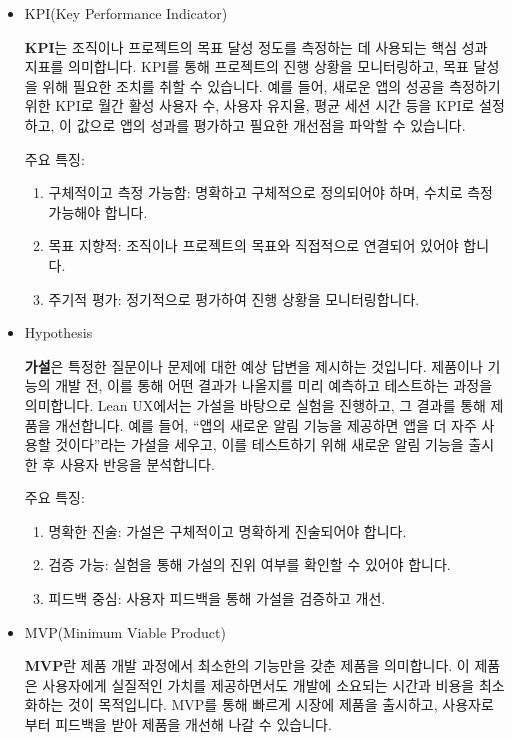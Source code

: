 \documentclass[
  letterpaper,
]{book}
\providecommand{\tightlist}{%
  \setlength{\itemsep}{0pt}\setlength{\parskip}{0pt}}\usepackage{longtable,booktabs,array}
\begin{document}
\begin{itemize}
\item
  KPI(Key Performance Indicator)

  \textbf{KPI}는 조직이나 프로젝트의 목표 달성 정도를 측정하는 데
  사용되는 핵심 성과 지표를 의미합니다. KPI를 통해 프로젝트의 진행
  상황을 모니터링하고, 목표 달성을 위해 필요한 조치를 취할 수 있습니다.
  예를 들어, 새로운 앱의 성공을 측정하기 위한 KPI로 월간 활성 사용자 수,
  사용자 유지율, 평균 세션 시간 등을 KPI로 설정하고, 이 값으로 앱의
  성과를 평가하고 필요한 개선점을 파악할 수 있습니다.

  주요 특징:

  \begin{enumerate}
  \def\labelenumi{\arabic{enumi}.}
  \tightlist
  \item
    구체적이고 측정 가능함: 명확하고 구체적으로 정의되어야 하며, 수치로
    측정 가능해야 합니다.
  \item
    목표 지향적: 조직이나 프로젝트의 목표와 직접적으로 연결되어 있어야
    합니다.
  \item
    주기적 평가: 정기적으로 평가하여 진행 상황을 모니터링합니다.
  \end{enumerate}
\item
  Hypothesis

  \textbf{가설}은 특정한 질문이나 문제에 대한 예상 답변을 제시하는
  것입니다. 제품이나 기능의 개발 전, 이를 통해 어떤 결과가 나올지를 미리
  예측하고 테스트하는 과정을 의미합니다. Lean UX에서는 가설을 바탕으로
  실험을 진행하고, 그 결과를 통해 제품을 개선합니다. 예를 들어, ``앱의
  새로운 알림 기능을 제공하면 앱을 더 자주 사용할 것이다''라는 가설을
  세우고, 이를 테스트하기 위해 새로운 알림 기능을 출시한 후 사용자
  반응을 분석합니다.

  주요 특징:

  \begin{enumerate}
  \def\labelenumi{\arabic{enumi}.}
  \tightlist
  \item
    명확한 진술: 가설은 구체적이고 명확하게 진술되어야 합니다.
  \item
    검증 가능: 실험을 통해 가설의 진위 여부를 확인할 수 있어야 합니다.
  \item
    피드백 중심: 사용자 피드백을 통해 가설을 검증하고 개선.
  \end{enumerate}
\item
  MVP(Minimum Viable Product)

  \textbf{MVP}란 제품 개발 과정에서 최소한의 기능만을 갖춘 제품을
  의미합니다. 이 제품은 사용자에게 실질적인 가치를 제공하면서도 개발에
  소요되는 시간과 비용을 최소화하는 것이 목적입니다. MVP를 통해 빠르게
  시장에 제품을 출시하고, 사용자로부터 피드백을 받아 제품을 개선해 나갈
  수 있습니다.


\end{itemize}
\end{document}
